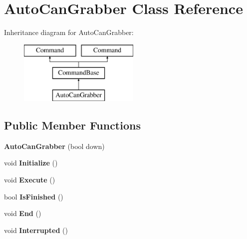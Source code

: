 \hypertarget{class_auto_can_grabber}{}\section{Auto\+Can\+Grabber Class Reference}
\label{class_auto_can_grabber}
Inheritance diagram for Auto\+Can\+Grabber\+:\begin{figure}[H]
\begin{center}
\leavevmode
\includegraphics[height=3.000000cm]{class_auto_can_grabber}
\end{center}
\end{figure}
\subsection*{Public Member Functions}
\begin{DoxyCompactItemize}
\item 
\hypertarget{class_auto_can_grabber_a9ceccca06bb2ec22c4b995f46c36d0b7}{}{\bfseries Auto\+Can\+Grabber} (bool down)\label{class_auto_can_grabber_a9ceccca06bb2ec22c4b995f46c36d0b7}

\item 
\hypertarget{class_auto_can_grabber_aaf54de7327a81718ee71104e93412ac4}{}void {\bfseries Initialize} ()\label{class_auto_can_grabber_aaf54de7327a81718ee71104e93412ac4}

\item 
\hypertarget{class_auto_can_grabber_add9cbd78fe6d9dbd3ce5f5a08d1d905d}{}void {\bfseries Execute} ()\label{class_auto_can_grabber_add9cbd78fe6d9dbd3ce5f5a08d1d905d}

\item 
\hypertarget{class_auto_can_grabber_a466f32915e9f2c65618b98fd8389b4c4}{}bool {\bfseries Is\+Finished} ()\label{class_auto_can_grabber_a466f32915e9f2c65618b98fd8389b4c4}

\item 
\hypertarget{class_auto_can_grabber_a254da544e813595bd6a6a71b340b58d5}{}void {\bfseries End} ()\label{class_auto_can_grabber_a254da544e813595bd6a6a71b340b58d5}

\item 
\hypertarget{class_auto_can_grabber_ad524843a58e67fd0ef4a522bc0bdcd33}{}void {\bfseries Interrupted} ()\label{class_auto_can_grabber_ad524843a58e67fd0ef4a522bc0bdcd33}

\end{DoxyCompactItemize}
